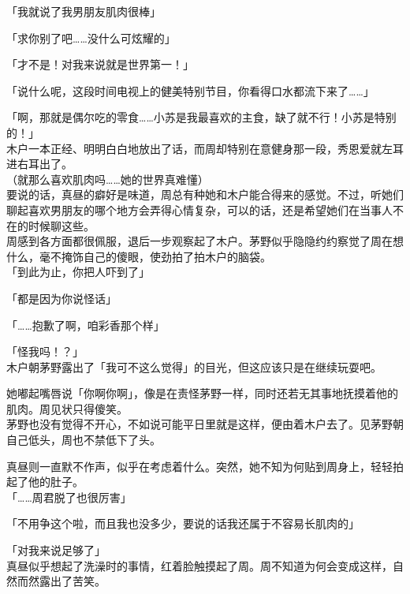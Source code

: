 「我就说了我男朋友肌肉很棒」

「求你别了吧……没什么可炫耀的」

「才不是！对我来说就是世界第一！」

「说什么呢，这段时间电视上的健美特别节目，你看得口水都流下来了……」

「啊，那就是偶尔吃的零食……小苏是我最喜欢的主食，缺了就不行！小苏是特别的！」\\

木户一本正经、明明白白地放出了话，而周却特别在意健身那一段，秀恩爱就左耳进右耳出了。\\

（就那么喜欢肌肉吗……她的世界真难懂）\\

要说的话，真昼的癖好是味道，周总有种她和木户能合得来的感觉。不过，听她们聊起喜欢男朋友的哪个地方会弄得心情复杂，可以的话，还是希望她们在当事人不在的时候聊这些。\\

周感到各方面都很佩服，退后一步观察起了木户。茅野似乎隐隐约约察觉了周在想什么，毫不掩饰自己的傻眼，使劲拍了拍木户的脑袋。\\

「到此为止，你把人吓到了」

「都是因为你说怪话」

「……抱歉了啊，咱彩香那个样」

「怪我吗！？」\\

木户朝茅野露出了「我可不这么觉得」的目光，但这应该只是在继续玩耍吧。

她嘟起嘴唇说「你啊你啊」，像是在责怪茅野一样，同时还若无其事地抚摸着他的肌肉。周见状只得傻笑。\\

茅野也没有觉得不开心，不如说可能平日里就是这样，便由着木户去了。见茅野朝自己低头，周也不禁低下了头。

真昼则一直默不作声，似乎在考虑着什么。突然，她不知为何贴到周身上，轻轻拍起了他的肚子。\\

「……周君脱了也很厉害」

「不用争这个啦，而且我也没多少，要说的话我还属于不容易长肌肉的」

「对我来说足够了」\\

真昼似乎想起了洗澡时的事情，红着脸触摸起了周。周不知道为何会变成这样，自然而然露出了苦笑。
